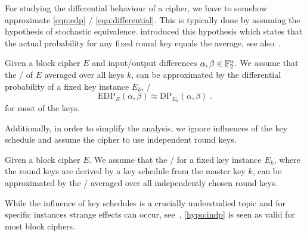 For studying the differential behaviour of a cipher, we have to somehow approximate \cref{eqn:edp} \resp/ \cref{eqn:differential}.
This is typically done by assuming the hypothesis of stochastic equivalence.
\textcite{EC:LaiMasMur91} introduced this hypothesis which states that the actual probability for any fixed round key equals the average, see also~\cite[p.~121]{rijndael_book}.
\begin{hypothesis}\label{hypo:equiv}
    Given a block cipher $E$ and input/output differences $\alpha, \beta \in \mathbb{F}_2^n$.
    We assume that the \EDP/ of $E$ averaged over all keys $k$, can be approximated by the differential probability of a fixed key instance $E_k$, \ie/
    \begin{equation*}
        \mathrm{EDP}_E(\alpha, \beta)
        \approx \mathrm{DP}_{E_k}(\alpha, \beta)\;.
    \end{equation*}
    for most of the keys.
\end{hypothesis}
Additionally, in order to simplify the analysis, we ignore influences of the key schedule and assume the cipher to use independent round keys.
\begin{hypothesis}\label{hypo:indp}
    Given a block cipher $E$.
    We assume that the \EDP/ for a fixed key instance $E_k$, where the round keys are derived by a key schedule from the master key $k$, can be approximated by the \EDP/ averaged over all independently chosen round keys.
\end{hypothesis}
While the influence of key schedules is a crucially understudied topic and for specific instances strange effects can occur, see~\cite{C:AABL12,ToSC:KraLeaWie17}, \cref{hypo:indp} is seen as valid for most block ciphers.


